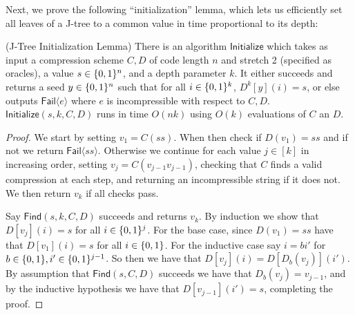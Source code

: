 Next, we prove the following ``initialization'' lemma, which lets us efficiently set all leaves of a J-tree to a common value in time proportional to its depth:
\begin{lemma}\label{lossy:lem:initialization}(J-Tree Initialization Lemma)
There is an algorithm $\mathsf{Initialize}$ which takes as input a compression scheme $C,D$ of code length $n$ and stretch 2 (specified as oracles), a value $s \in \{0,1\}^n$, and a depth parameter $k$. It either succeeds and returns a seed $y \in \{0,1\}^n$ such that for all $i \in \{0,1\}^k$, $D^k[y](i) = s$, or else outputs $\mathsf{Fail}\langle e \rangle$ where $e$ is incompressible with respect to $C,D$. $\mathsf{Initialize}(s,k,C,D)$ runs in time $O(nk)$ using $O(k)$ evaluations of $C$ an $D$.
\end{lemma}
\begin{proof}
We start by setting $v_1 = C(ss)$. When then check if $D(v_1) = ss$ and if not we return $\mathsf{Fail}\langle ss \rangle$. Otherwise we continue for each value $j \in [k]$ in increasing order, setting $v_j = C(v_{j-1}v_{j-1})$, checking that $C$ finds a valid compression at each step, and returning an incompressible string if it does not. We then return $v_k$ if all checks pass. 

Say $\mathsf{Find}(s,k,C,D)$ succeeds and returns $v_k$. By induction we show that $D[v_j](i) = s$ for all $i \in \{0,1\}^j$. For the base case, since $D(v_1) = ss$ have that $D[v_1](i)=s$ for all $i \in \{0,1\}$. For the inductive case say $i = bi'$ for $b \in \{0,1\}, i' \in \{0,1\}^{j-1}$. So then we have that $D[v_j](i) = D[D_b(v_j)](i')$. By assumption that $\mathsf{Find}(s,C,D)$ succeeds we have that $D_b(v_j) = v_{j-1}$, and by the inductive hypothesis we have that $D[v_{j-1}](i') = s$, completing the proof.
\end{proof}

